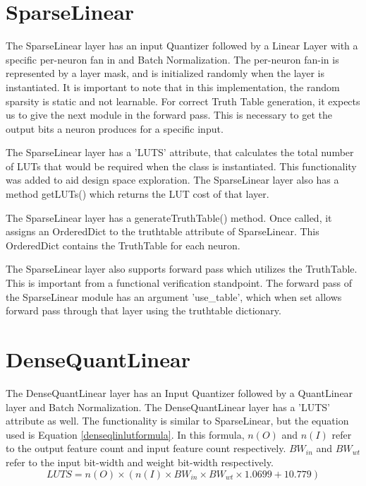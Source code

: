 \section{SparseLinear}
The SparseLinear layer has an input Quantizer followed by a Linear Layer with a specific per-neuron fan in and Batch Normalization. The per-neuron fan-in is represented by a layer mask, and is initialized randomly when the layer is instantiated. It is important to note that in this implementation, the random sparsity is static and not learnable. For correct Truth Table generation, it expects us to give the next module in the forward pass. This is necessary to get the output bits a neuron produces for a specific input.

The SparseLinear layer has a 'LUTS' attribute, that calculates the total number of LUTs that would be required when the class is instantiated. This functionality was added to aid design space exploration. The SparseLinear layer also has a method getLUTs() which returns the LUT cost of that layer.

The SparseLinear layer has a generateTruthTable() method. Once called, it assigns an OrderedDict to the truthtable attribute of SparseLinear. This OrderedDict contains the TruthTable for each neuron.

The SparseLinear layer also supports forward pass which utilizes the TruthTable. This is important from a functional verification standpoint. The forward pass of the SparseLinear module has an argument 'use\_table', which when set allows forward pass through that layer using the truthtable dictionary.

\section{DenseQuantLinear}
The DenseQuantLinear layer has an Input Quantizer followed by a QuantLinear layer and Batch Normalization. 
The DenseQuantLinear layer has a 'LUTS' attribute as well. The functionality is similar to SparseLinear, but the equation used is Equation \eqref{denseqlinlutformula}. In this formula, $n(O)$ and $n(I)$ refer to the output feature count and input feature count respectively. $BW_{in}$ and $BW_{wt}$ refer to the input bit-width and weight bit-width respectively. 
\begin{equation}
    LUTS = n(O)\times(n(I)\times BW_{in}\times BW_{wt}\times 1.0699 + 10.779)
    \label{denseqlinlutformula}
\end{equation}


